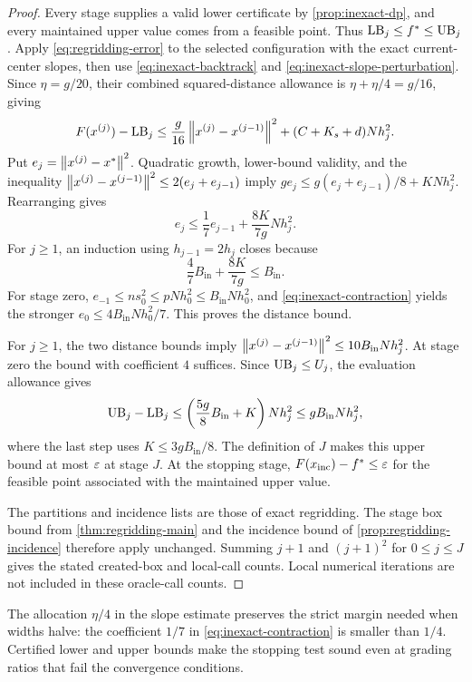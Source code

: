 \begin{proof}
Every stage supplies a valid lower certificate by
\cref{prop:inexact-dp}, and every maintained upper value comes from a
feasible point.  Thus $\mathrm{LB}_j\le f^*\le\mathrm{UB}_j$.
Apply \eqref{eq:regridding-error} to the selected configuration with
the exact current-center slopes, then use
\eqref{eq:inexact-backtrack} and
\eqref{eq:inexact-slope-perturbation}.  Since $\eta=g/20$, their
combined squared-distance allowance is $\eta+\eta/4=g/16$, giving
\[
 F(x^{(j)})-\mathrm{LB}_j
    \le\frac g{16}\left\lVert x^{(j)}-x^{(j-1)}\right\rVert^2
                      +(C+K_s+d)Nh_j^2.
\]
Put $e_j=\left\lVert x^{(j)}-x^*\right\rVert^2$.  Quadratic growth, lower-bound
validity, and the inequality
$\left\lVert x^{(j)}-x^{(j-1)}\right\rVert^2\le2(e_j+e_{j-1})$ imply
$ge_j\le g(e_j+e_{j-1})/8+KNh_j^2$.  Rearranging gives
\begin{equation}
 e_j\le\frac17e_{j-1}+\frac{8K}{7g}Nh_j^2.
 \label{eq:inexact-contraction}
\end{equation}
For $j\ge1$, an induction using $h_{j-1}=2h_j$ closes because
\[
 \frac47B_{\mathrm{in}}+\frac{8K}{7g}
       \le B_{\mathrm{in}}.
\]
For stage zero, $e_{-1}\le n s_0^2\le pNh_0^2
\le B_{\mathrm{in}}Nh_0^2$, and
\eqref{eq:inexact-contraction} yields the stronger
$e_0\le4B_{\mathrm{in}}Nh_0^2/7$.  This proves the distance bound.

For $j\ge1$, the two distance bounds imply
$\left\lVert x^{(j)}-x^{(j-1)}\right\rVert^2\le10B_{\mathrm{in}}Nh_j^2$.
At stage zero the bound with coefficient $4$ suffices.  Since
$\mathrm{UB}_j\le U_j$, the evaluation allowance gives
\[
 \mathrm{UB}_j-\mathrm{LB}_j
   \le\left(\frac{5g}{8}B_{\mathrm{in}}+K\right)Nh_j^2
   \le gB_{\mathrm{in}}Nh_j^2,
\]
where the last step uses $K\le3gB_{\mathrm{in}}/8$.  The definition
of $J$ makes this upper bound at most $\varepsilon$ at stage $J$.
At the stopping stage, $F(x_{\mathrm{inc}})-f^*\le\varepsilon$ for the
feasible point associated with the maintained upper value.

The partitions and incidence lists are those of exact regridding.
The stage box bound from \cref{thm:regridding-main} and the incidence
bound of \cref{prop:regridding-incidence} therefore apply unchanged.
Summing $j+1$ and $(j+1)^2$ for $0\le j\le J$ gives the stated
created-box and local-call counts.  Local numerical iterations are not
included in these oracle-call counts.
\end{proof}

The allocation $\eta/4$ in the slope estimate preserves the strict
margin needed when widths halve: the coefficient $1/7$ in
\eqref{eq:inexact-contraction} is smaller than $1/4$.  Certified
lower and upper bounds make the stopping test sound even at grading
ratios that fail the convergence conditions.

